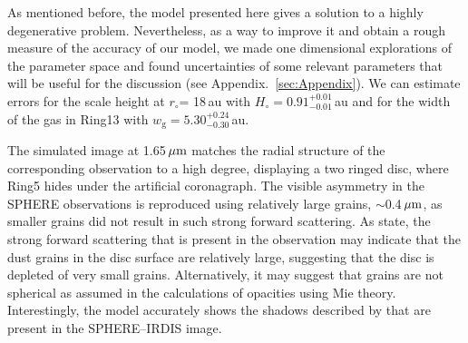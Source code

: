 \documentclass[fleqn,usenatbib,useAMS]{mnras}
\begin{document}
As mentioned before, the model presented here gives a solution to a highly degenerative problem. Nevertheless, as a way to improve it and obtain a rough measure of the accuracy of our model, we made one dimensional explorations of the parameter space and found uncertainties of some relevant parameters that will be useful for the discussion (see Appendix.~\ref{sec:Appendix}). We can estimate errors for the scale height at $r_\circ$= 18\,au with $H_\circ = 0.91^{+0.01}_{-0.01}$\,au and for the width of the gas in Ring13 with $w_\mathrm{g} = 5.30^{+0.24}_{-0.30}$\,au.


The simulated image at 1.65\,$\hbox{$\mu$m}$ matches the radial structure of the corresponding observation to a high degree, displaying a two ringed disc, where Ring5 hides under the artificial coronagraph. The visible asymmetry in the SPHERE observations is reproduced using relatively large grains, $\sim$0.4\,$\hbox{$\mu$m}$, as smaller grains did not result in such strong forward scattering. As \citet{refId0} state, the strong forward scattering that is present in the observation may indicate that the dust grains in the disc surface are relatively large, suggesting that the disc is depleted of very small grains. Alternatively, it may suggest that grains are not spherical as assumed in the calculations of opacities using Mie theory. Interestingly, the model accurately shows the shadows described by \citet{dOrazi} that are present in the SPHERE--IRDIS image.
\end{document}
